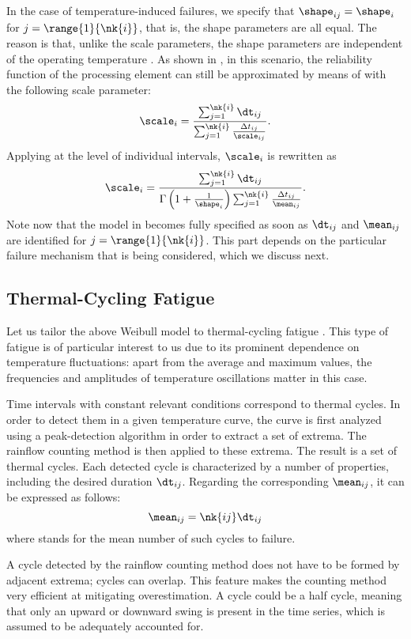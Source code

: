 In the case of temperature-induced failures, we specify that $\shape_{ij} =
\shape_i$ for $j = \range{1}{\nk{i}}$, that is, the shape parameters are all
equal. The reason is that, unlike the scale parameters, the shape parameters are
independent of the operating temperature \cite{chang2006}. As shown in
\cite{xiang2010}, in this scenario, the reliability function of the processing
element can still be approximated by means of  with
the following scale parameter:
\[
  \scale_i = \frac{\sum_{j = 1}^{\nk{i}} \dt_{ij}}{\sum_{j = 1}^{\nk{i}} \frac{\Delta t_{ij}}{\scale_{ij}}}.
\]
Applying  at the level of individual intervals,
$\scale_i$ is rewritten as
\[
  \scale_i = \frac{\sum_{j = 1}^{\nk{i}} \dt_{ij}}{\Gamma\left(1 + \frac{1}{\shape_i}\right) \sum_{j = 1}^{\nk{i}} \frac{\Delta t_{ij}}{\mean_{ij}}}.
\]
Note now that the model in  becomes fully specified as
soon as $\dt_{ij}$ and $\mean_{ij}$ are identified for $j = \range{1}{\nk{i}}$.
This part depends on the particular failure mechanism that is being considered,
which we discuss next.

\subsection{Thermal-Cycling Fatigue}

Let us tailor the above Weibull model to thermal-cycling fatigue
\cite{jedec2016}. This type of fatigue is of particular interest to us due to
its prominent dependence on temperature fluctuations: apart from the average and
maximum values, the frequencies and amplitudes of temperature oscillations
matter in this case.

Time intervals with constant relevant conditions correspond to thermal cycles.
In order to detect them in a given temperature curve, the curve is first
analyzed using a peak-detection algorithm in order to extract a set of extrema.
The rainflow counting method \cite{xiang2010} is then applied to these extrema.
The result is a set of  thermal cycles. Each detected cycle is
characterized by a number of properties, including the desired duration
$\dt_{ij}$. Regarding the corresponding $\mean_{ij}$, it can be expressed as
follows:
\[
  \mean_{ij} = \nk{ij} \dt_{ij}
\]
where  stands for the mean number of such cycles to failure.

\begin{remark}
A cycle detected by the rainflow counting method does not have to be formed by
adjacent extrema; cycles can overlap. This feature makes the counting method
very efficient at mitigating overestimation. A cycle could be a half cycle,
meaning that only an upward or downward swing is present in the time series,
which is assumed to be adequately accounted for.
\end{remark}

